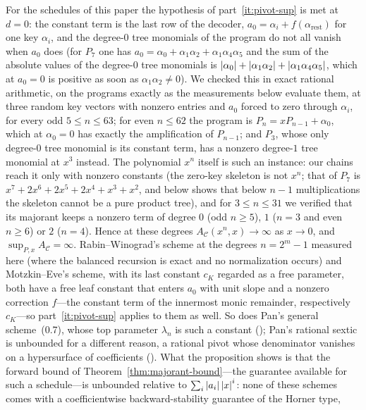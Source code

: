 For the schedules of this paper the hypothesis of part~\ref{it:pivot-sup}
is met at $d=0$: the constant term is the last row of the decoder,
$a_0=\alpha_i+f(\alpha_{\mathrm{rest}})$ for one key $\alpha_i$, and the
degree-$0$ tree monomials of the program do not all vanish when $a_0$ does
(for $P_7$ one has $a_0=\alpha_0+\alpha_1\alpha_2+\alpha_1\alpha_4\alpha_5$
and the sum of the absolute values of the degree-$0$ tree monomials is
$\left\lvert \alpha_0\right\rvert+\left\lvert \alpha_1\alpha_2\right\rvert+\left\lvert \alpha_1\alpha_4\alpha_5\right\rvert$, which
at $a_0=0$ is positive as soon as $\alpha_1\alpha_2\ne0$).  We checked this in exact
rational arithmetic, on the programs exactly as the measurements below
evaluate them, at three random key vectors with nonzero entries and $a_0$
forced to zero through $\alpha_i$, for every odd $5\le n\le63$; for even
$n\le62$ the program is $P_n=xP_{n-1}+\alpha_0$, which at $\alpha_0=0$ has
exactly the amplification of $P_{n-1}$; and $P_3$, whose only degree-$0$
tree monomial is its constant term, has a nonzero degree-$1$ tree monomial
at $x^3$ instead.  The polynomial $x^n$ itself is such an instance: our
chains reach it only with nonzero constants (the zero-key skeleton is not
$x^n$; that of $P_7$ is $x^7+2x^6+2x^5+2x^4+x^3+x^2$, and
 below shows that below $n-1$ multiplications the
skeleton cannot be a pure product tree), and for $3\le n\le31$ we verified
that its majorant keeps a nonzero term of degree $0$ (odd $n\ge5$), $1$
($n=3$ and even $n\ge6$) or $2$ ($n=4$).  Hence at these degrees
$A_{\mathcal C}(x^n,x)\to\infty$ as $x\to0$, and
$\sup_{P,x}A_{\mathcal C}=\infty$.  Rabin--Winograd's scheme at the degrees
$n=2^m-1$ measured here (where the balanced recursion is exact and no
normalization occurs) and Motzkin--Eve's scheme, with its last constant $c_K$
regarded as a free parameter, both have a free leaf constant that enters
$a_0$ with unit slope and a nonzero correction $f$---the constant term of the
innermost monic remainder, respectively $c_K$---so part~\ref{it:pivot-sup}
applies to them as well.  So does Pan's general scheme~(0.7), whose top
parameter $\lambda_n$ is such a constant (); Pan's
rational sextic is unbounded for a different reason, a rational pivot whose
denominator vanishes on a hypersurface of coefficients
().
What the proposition
shows is that the forward bound of Theorem~\ref{thm:majorant-bound}---the
guarantee available for such a schedule---is unbounded relative to
$\sum_i\left\lvert a_i\right\rvert\left\lvert x\right\rvert^i$: none of these schemes comes with a
coefficientwise backward-stability guarantee of the Horner type,
